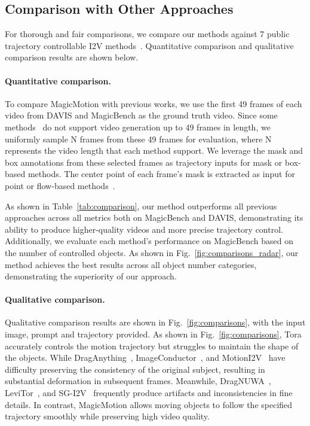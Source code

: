 \subsection{Comparison with Other Approaches}
For thorough and fair comparisons, we compare our methods against 7 public trajectory controllable I2V methods~\cite{zhang2025tora, wang2025levitor, yin2023dragnuwa, wu2024draganything, shi2024motion, li2025image, namekata2024sgi2v}. Quantitative comparison and qualitative comparison results are shown below.



\vspace{-0.5em}
\paragraph{Quantitative comparison.}
To compare MagicMotion with previous works, we use the first 49 frames of each video from DAVIS and MagicBench as the ground truth video. Since some methods~\cite{namekata2024sgi2v, wang2025levitor, yin2023dragnuwa, wu2024draganything, shi2024motion, li2025image} do not support video generation up to 49 frames in length, we uniformly sample N frames from these 49 frames for evaluation, where N represents the video length that each method support.
We leverage the mask and box annotations from these selected frames as trajectory inputs for mask or box-based methods. 
The center point of each frame's mask is extracted as input for point or flow-based methods~\cite{zhang2025tora, wang2025levitor, yin2023dragnuwa, wu2024draganything, shi2024motion, li2025image}. 

As shown in Table~\ref{tab:comparison}, our method outperforms all previous approaches across all metrics both on MagicBench and DAVIS, demonstrating its ability to produce higher-quality videos and more precise trajectory control.
Additionally, we evaluate each method’s performance on MagicBench based on the number of controlled objects. As shown in Fig.~\ref{fig:comparisons_radar}, our method achieves the best results across all object number categories, demonstrating the superiority of our approach. 


\vspace{-0.5cm}
\paragraph{Qualitative comparison.}
Qualitative comparison results are shown in Fig.~\ref{fig:comparisons}, with the input image, prompt and trajectory provided. 
As shown in Fig.~\ref{fig:comparisons}, Tora~\cite{zhang2025tora} accurately controls the motion trajectory but struggles to maintain the shape of the objects. While DragAnything~\cite{wu2024draganything}, ImageConductor~\cite{li2025image}, and MotionI2V~\cite{shi2024motion} have difficulty preserving the consistency of the original subject, resulting in substantial deformation in subsequent frames. Meanwhile, DragNUWA~\cite{yin2023dragnuwa}, LeviTor~\cite{wang2025levitor}, and SG-I2V~\cite{namekata2024sgi2v} frequently produce artifacts and inconsistencies in fine details. In contrast, MagicMotion allows moving objects to follow the specified trajectory smoothly while preserving high video quality.

